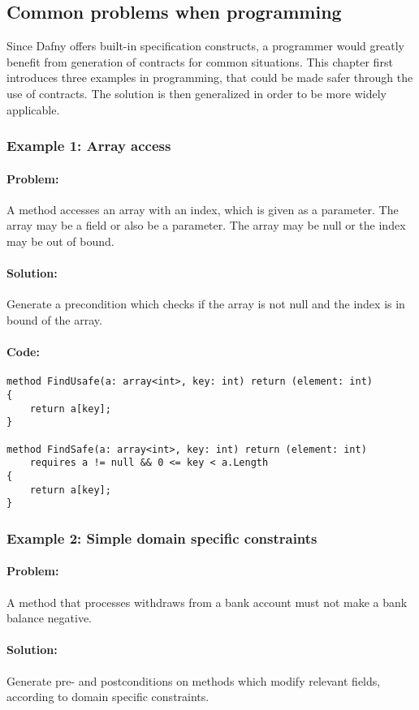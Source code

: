 \subsection{Common problems when programming} \label{examples}
Since Dafny offers built-in specification constructs, a programmer would greatly benefit from generation of contracts for common situations. This chapter first introduces three examples in programming, that could be made safer through the use of contracts. The solution is then generalized in order to be more widely applicable.
\subsubsection{Example 1: Array access} \label{Example 1}
\paragraph{Problem:}
A method accesses an array with an index, which is given as a parameter. The array may be a field or also be a parameter. The array may be null or the index may be out of bound.
\paragraph{Solution:}
Generate a precondition which checks if the array is not null and the index is in bound of the array.
\paragraph{Code:}
\begin{lstlisting}[language=dafny]
method FindUsafe(a: array<int>, key: int) return (element: int)
{
	return a[key];
}

method FindSafe(a: array<int>, key: int) return (element: int)
	requires a != null && 0 <= key < a.Length
{
	return a[key];
}
\end{lstlisting}
\subsubsection{Example 2: Simple domain specific constraints} \label{Example 2}
\paragraph{Problem:}
A method that processes withdraws from a bank account must not make a bank balance negative.
\paragraph{Solution:}
Generate pre- and postconditions on methods which modify relevant fields, according to domain specific constraints.

